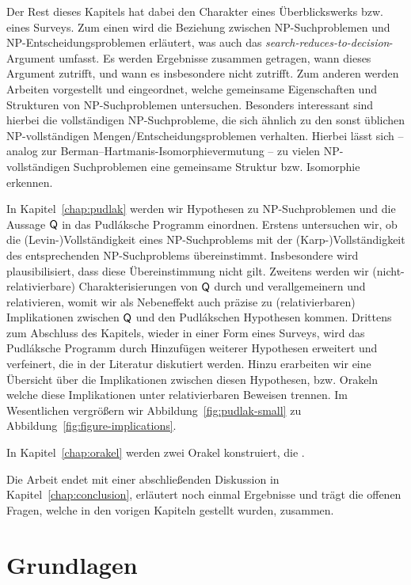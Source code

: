 Der Rest dieses Kapitels hat dabei den Charakter eines Überblickswerks bzw. eines Surveys. 
Zum einen wird die Beziehung zwischen NP-Suchproblemen und NP-Entscheidungsproblemen erläutert, was auch das \emph{search-reduces-to-decision}-Argument umfasst. Es werden Ergebnisse zusammen getragen, wann dieses Argument zutrifft, und wann es insbesondere nicht zutrifft.
Zum anderen werden Arbeiten vorgestellt und eingeordnet, welche gemeinsame Eigenschaften und Strukturen von NP-Suchproblemen untersuchen. Besonders interessant sind hierbei die vollständigen NP-Suchprobleme, die sich ähnlich zu den sonst üblichen NP-vollständigen Mengen/Entscheidungsproblemen verhalten. Hierbei lässt sich -- analog zur Berman--Hartmanis-Isomorphievermutung -- zu vielen NP-vollständigen Suchproblemen eine gemeinsame Struktur bzw. Isomorphie erkennen.

In Kapitel~\ref{chap:pudlak} werden wir Hypothesen zu NP-Suchproblemen und die Aussage $\mathsf{Q}$ in das Pudláksche Programm einordnen. Erstens untersuchen wir, ob die (Levin-)Vollständigkeit eines NP-Suchproblems  mit der (Karp-)Vollständigkeit des entsprechenden NP-Suchproblems übereinstimmt. Insbesondere wird plausibilisiert, dass diese Übereinstimmung nicht gilt.
Zweitens werden wir (nicht-relativierbare) Charakterisierungen von $\mathsf{Q}$ durch \textcite{fenner_inverting_2003} und \textcite{messner_simulation_2001} verallgemeinern und relativieren, womit wir als Nebeneffekt auch präzise zu (relativierbaren) Implikationen zwischen $\mathsf{Q}$ und den Pudlákschen Hypothesen kommen.
Drittens zum Abschluss des Kapitels, wieder in einer Form eines Surveys, wird das Pudláksche Programm durch Hinzufügen weiterer Hypothesen erweitert und verfeinert, die in der Literatur diskutiert werden. Hinzu erarbeiten wir eine Übersicht über die Implikationen zwischen diesen Hypothesen, bzw. Orakeln welche diese Implikationen unter relativierbaren Beweisen trennen. Im Wesentlichen vergrößern wir Abbildung~\ref{fig:pudlak-small} zu Abbildung~\ref{fig:figure-implications}.

In Kapitel~\ref{chap:orakel} werden zwei Orakel konstruiert, die .

Die Arbeit endet mit einer abschließenden Diskussion in Kapitel~\ref{chap:conclusion}, erläutert noch einmal Ergebnisse und trägt die offenen Fragen, welche in den vorigen Kapiteln gestellt wurden, zusammen.



\chapter{Grundlagen}\label{chap:prelim}

